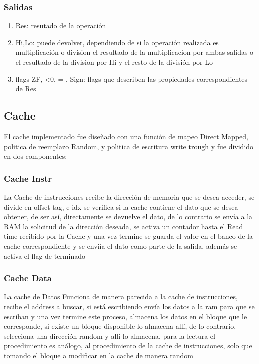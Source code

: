 \documentclass{article}
\begin{document}
            \subsubsection{Salidas}
                \begin{enumerate}
                    \item Res: resutado de la operaci\'on
                    \item Hi,Lo: puede devolver, dependiendo de si la operaci\'on realizada es multiplicaci\'on o division el resultado de la multiplicacion por ambas salidas o el resultado de la division por Hi y el resto de la divisi\'on por Lo
                    \item flags ZF, <0, = , Sign: flags que describen las propiedades correspondientes de Res
                \end{enumerate}

        \subsection{Cache}
        \label{sec:Cache}
            El cache implementado fue dise\~nado con una funci\'on de mapeo Direct Mapped, politica de reemplazo Random, y politica de escritura write trough y fue dividido en dos componentes:
            \subsubsection{Cache Instr}
                La Cache de instrucciones recibe la direcci\'on de memoria que se desea acceder, se divide en offset tag, e idx
                se verifica si la cache contiene el dato que se desea obtener, de ser as\'i, directamente se devuelve el dato, de lo contrario
                se env\'ia a la RAM la solicitud de la direcci\'on deseada, se activa un contador hasta el Read time recibido por la Cache y una vez termine
                se guarda el valor en el banco de la cache correspondiente y se envi\'ia el dato como parte de la salida, adem\'as se activa el flag de terminado
            
            \subsubsection{Cache Data}
                La cache de Datos Funciona de manera parecida a la cache de instrucciones, recibe el address a buscar, si est\'a escribiendo env\'ia los datos a la ram para que se escriban y una vez termine 
                este proceso, almacena los datos en el bloque que le corresponde, si existe un bloque disponible lo almacena all\'i, de lo contrario, selecciona una direcci\'on random y alli lo almacena, para la 
                lectura el procedimiento es an\'alogo, al procedimiento de la cache de instrucciones, solo que tomando el bloque a modificar en la cache de manera random     
\end{document}
